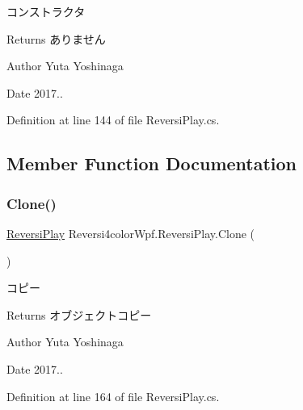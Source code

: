 コンストラクタ 

\begin{DoxyReturn}{Returns}
ありません 
\end{DoxyReturn}
\begin{DoxyAuthor}{Author}
Yuta Yoshinaga 
\end{DoxyAuthor}
\begin{DoxyDate}{Date}
2017.. 
\end{DoxyDate}


Definition at line 144 of file Reversi\+Play.\+cs.



\subsection{Member Function Documentation}
\mbox{\label{class_reversi4color_wpf_1_1_reversi_play_a9140ddb26faa06482d52cb9243236203}} 
\subsubsection{\texorpdfstring{Clone()}{Clone()}}
{\footnotesize\ttfamily \hyperlink{class_reversi4color_wpf_1_1_reversi_play}{Reversi\+Play} Reversi4color\+Wpf.\+Reversi\+Play.\+Clone (\begin{DoxyParamCaption}{ }\end{DoxyParamCaption})}



コピー 

\begin{DoxyReturn}{Returns}
オブジェクトコピー 
\end{DoxyReturn}
\begin{DoxyAuthor}{Author}
Yuta Yoshinaga 
\end{DoxyAuthor}
\begin{DoxyDate}{Date}
2017.. 
\end{DoxyDate}


Definition at line 164 of file Reversi\+Play.\+cs.

\mbox{\label{class_reversi4color_wpf_1_1_reversi_play_ab28025c8262b1f7fb97de3b7796a2650}} 
